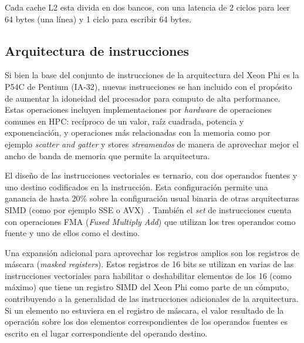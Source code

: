 Cada cache L2 esta divida en dos bancos, con una latencia de 2 ciclos para leer 64 bytes (una l\'inea) y 1 ciclo para escribir 64 bytes.


\subsection{Arquitectura de instrucciones}

Si bien la base del conjunto de instrucciones de la arquitectura del Xeon Phi es la P54C de Pentium (IA-32), nuevas instrucciones
se han incluido con el prop\'osito de aumentar la idoneidad del procesador para computo de alta performance.
Estas operaciones incluyen implementaciones por \textit{hardware} de operaciones comunes en HPC: rec\'iproco de un valor,
ra\'iz cuadrada, potencia y exponenciaci\'on, y operaciones m\'as relacionadas con la memoria como por ejemplo \textit{scatter and gatter}
y stores \textit{streameados} de manera de aprovechar mejor el ancho de banda de memoria que permite la arquitectura.

El dise\~no de las instrucciones vectoriales es ternario, con dos operandos fuentes y uno destino codificados en la instrucci\'on.
Esta configuraci\'on permite una ganancia de hasta 20\% sobre la configuraci\'on usual binaria de otras arquitecturas SIMD (como
por ejemplo SSE o AVX)~\cite{BookXeonPhi}. Tambi\'en el \textit{set} de instrucciones cuenta con operaciones FMA (\textit{Fused
Multiply Add}) que utilizan los tres operandos como fuente y uno de ellos como el destino.

Una expansi\'on adicional para aprovechar los registros amplios son los registros de m\'ascara (\textit{masked registers}).
Estos registros de 16 bits se utilizan en varias de las instrucciones vectoriales para habilitar o deshabilitar elementos
de los 16 (como m\'aximo) que tiene un registro SIMD del Xeon Phi como parte de un c\'omputo, contribuyendo a la generalidad de
las instrucciones adicionales de la arquitectura. Si un elemento no estuviera en el registro de m\'ascara, el valor resultado de la operaci\'on
sobre los dos elementos correspondientes de los operandos fuentes es escrito en el lugar correspondiente del operando destino.

